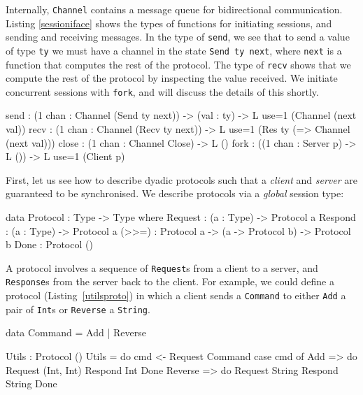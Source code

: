 Internally, \texttt{Channel} contains a message queue for bidirectional
communication.
Listing \ref{sessioniface} shows the types of functions for
initiating sessions, and sending and receiving messages.
In the type of \texttt{send}, we see that to send a value of type
\texttt{ty} we must have a channel in the state \texttt{Send ty next},
where \texttt{next} is a function that computes the rest of the protocol.
The type of \texttt{recv} shows that we compute the rest of the protocol
by inspecting the value received. We initiate concurrent sessions with
\texttt{fork}, and will discuss the details of this shortly.

\begin{code}[float=h,frame=single,caption={Initiating and executing
concurrent sessions},label=sessioniface]
send : (1 chan : Channel (Send ty next)) -> (val : ty) ->
       L {use=1} (Channel (next val))
recv : (1 chan : Channel (Recv ty next)) ->
       L {use=1} (Res ty (\val => Channel (next val)))
close : (1 chan : Channel Close) -> L ()
fork : ((1 chan : Server p) -> L ()) -> L {use=1} (Client p)
\end{code}

First, let us see how to describe dyadic protocols such that a \emph{client}
and \emph{server} are guaranteed to be synchronised. We describe protocols
via a \emph{global} session type:

\begin{code}
data Protocol : Type -> Type where
     Request : (a : Type) -> Protocol a
     Respond : (a : Type) -> Protocol a
     (>>=) : Protocol a -> (a -> Protocol b) -> Protocol b
     Done : Protocol ()
\end{code}

A protocol involves a sequence of \texttt{Request}s from a client to
a server, and \texttt{Response}s from the server back to the client.
For example, we could define a protocol (Listing~\ref{utilsproto})
in which a client sends a \texttt{Command} to either \texttt{Add} a pair of
\texttt{Int}s or \texttt{Reverse} a \texttt{String}.

\begin{code}[float=h,frame=single,caption={A global session type describing
a protocol where a client can request either adding two \texttt{Int}s or
reversing a \texttt{String}},label=utilsproto]
data Command = Add | Reverse

Utils : Protocol ()
Utils = do cmd <- Request Command
           case cmd of
                Add => do Request (Int, Int)
                          Respond Int
                          Done
                Reverse => do Request String
                              Respond String
                              Done
\end{code}

